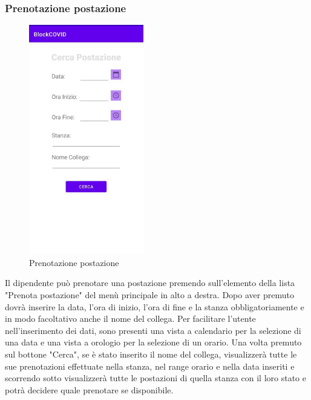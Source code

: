 \subsubsection{Prenotazione postazione}
\begin{figure}[H]
	\centering
	\includegraphics[width=5cm]{res/images/PrenotaPostazione.png}
	\caption{Prenotazione postazione}
\end{figure}
Il dipendente può prenotare una postazione premendo sull'elemento della lista "Prenota postazione" del menù principale in alto a destra.
Dopo aver premuto dovrà inserire la data, l'ora di inizio, l'ora di fine e la stanza obbligatoriamente e in modo facoltativo anche il nome del collega. Per facilitare l'utente nell'inserimento dei dati, sono presenti una vista a calendario per la selezione di una data e una vista a orologio per la selezione di un orario. Una volta premuto sul bottone "Cerca", se è stato inserito il nome del collega, visualizzerà tutte le sue prenotazioni effettuate nella stanza, nel range orario e nella data inseriti e scorrendo sotto visualizzerà tutte le postazioni di quella stanza con il loro stato e potrà decidere quale prenotare se disponibile. 


